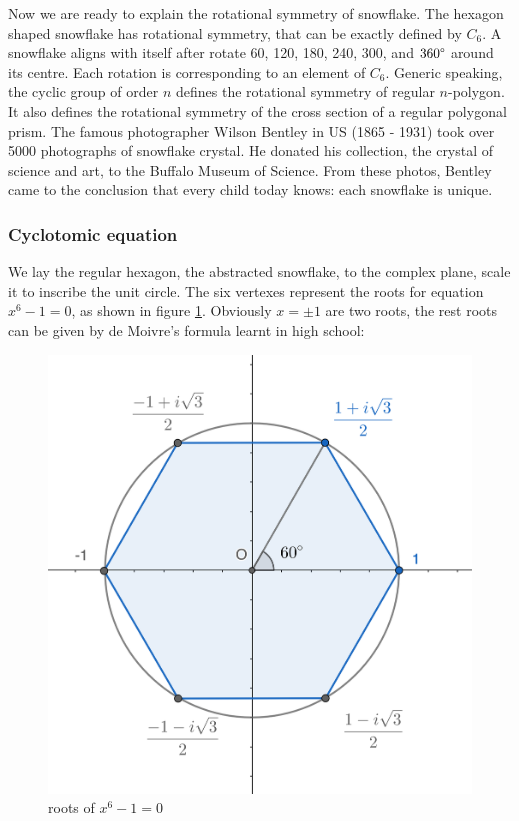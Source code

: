 \documentclass[b5paper]{article}
\begin{document}
Now we are ready to explain the rotational symmetry of snowflake. The hexagon shaped snowflake has rotational symmetry, that can be exactly defined by $C_6$. A snowflake aligns with itself after rotate 60\degree, 120\degree, 180\degree, 240\degree, 300\degree, and $360\degree$ around its centre. Each rotation is corresponding to an element of $C_6$. Generic speaking, the cyclic group of order $n$ defines the rotational symmetry of regular $n$-polygon. It also defines the rotational symmetry of the cross section of a regular polygonal prism. The famous photographer Wilson Bentley in US (1865 - 1931) took over 5000 photographs of snowflake crystal. He donated his collection, the crystal of science and art, to the Buffalo Museum of Science. From these photos, Bentley came to the conclusion that every child today knows: each snowflake is unique.

\subsubsection{Cyclotomic equation}

We lay the regular hexagon, the abstracted snowflake, to the complex plane, scale it to inscribe the unit circle. The six vertexes represent the roots for equation $x^6 - 1 = 0$, as shown in figure \ref{fig:cyclotomic-6}. Obviously $x = \pm 1$ are two roots, the rest roots can be given by de Moivre's formula learnt in high school:

\begin{figure}[htbp]
 \centering
 \includegraphics[scale=2]{img/cyclotomic-6}
 \caption{roots of $x^6 - 1 = 0$}
 \label{fig:cyclotomic-6}
\end{figure}
\end{document}
